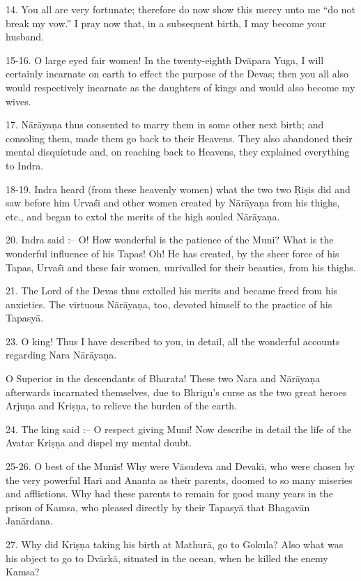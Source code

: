 14. You all are very fortunate; therefore do now show this mercy unto me ``do not break my vow.'' I pray now that, in a subsequent birth, I may become your husband.

15-16. O large eyed fair women! In the twenty-eighth Dv\=apara Yuga, I will certainly incarnate on earth to effect the purpose of the Devas; then you all also would respectively incarnate as the daughters of kings and would also become my wives.

17. N\=ar\=aya\d{n}a thus consented to marry them in some other next birth; and consoling them, made them go back to their Heavens. They also abandoned their mental disquietude and, on reaching back to Heavens, they explained everything to Indra.

18-19. Indra heard (from these heavenly women) what the two two \d{R}i\d{s}is did and saw before him Urva\'s\={\i} and other women created by N\=ar\=aya\d{n}a from his thighs, etc., and began to extol the merits of the high souled N\=ar\=aya\d{n}a.

20. Indra said :-- O! How wonderful is the patience of the Muni? What is the wonderful influence of his Tapas! Oh! He has created, by the sheer force of his Tapas, Urva\'s\={\i} and these fair women, unrivalled for their beauties, from his thighs.

21. The Lord of the Devas thus extolled his merits and became freed from his anxieties. The virtuous N\=ar\=aya\d{n}a, too, devoted himself to the practice of his Tapasy\=a.

23. O king! Thus I have described to you, in detail, all the wonderful accounts regarding Nara N\=ar\=aya\d{n}a.

O Superior in the descendants of Bharata! These two Nara and N\=ar\=aya\d{n}a afterwards incarnated themselves, due to Bhrigu's curse as the two great heroes Arju\d{n}a and Kri\d{s}\d{n}a, to relieve the burden of the earth.

24. The king said :-- O respect giving Muni! Now describe in detail the life of the Avatar Kri\d{s}\d{n}a and dispel my mental doubt.

25-26. O best of the Munis! Why were V\=asudeva and Devak\={\i}, who were chosen by the very powerful Hari and Ananta as their parents, doomed to so many miseries and afflictions. Why had these parents to remain for good many years in the prison of Kamsa, who pleased directly by their Tapasy\=a that Bhagav\=an Jan\=ardana.

27. Why did Kri\d{s}\d{n}a taking his birth at Mathur\=a, go to Gokula? Also what was his object to go to Dv\=ark\=a, situated in the ocean, when he killed the enemy Kamsa?

